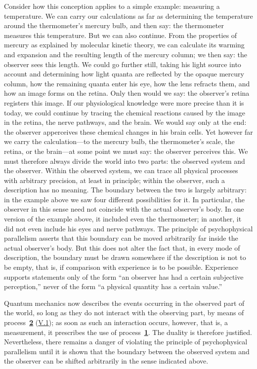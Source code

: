 \documentclass[fontsize=13pt,twoside,openany,headings=normal,parskip=false,bookmarkpackage=false,DIV=calc]{scrbook}
\begin{document}
Consider how this conception applies to a simple example: measuring a temperature. We can carry our calculations as far as determining the temperature around the thermometer's mercury bulb, and then say: the thermometer measures this temperature. But we can also continue. From the properties of mercury as explained by molecular kinetic theory, we can calculate its warming and expansion and the resulting length of the mercury column; we then say: the observer sees this length. We could go further still, taking his light source into account and determining how light quanta are reflected by the opaque mercury column, how the remaining quanta enter his eye, how the lens refracts them, and how an image forms on the retina. Only then would we say: the observer's retina registers this image. If our physiological knowledge were more precise than it is today, we could continue by tracing the chemical reactions caused by the image in the retina, the nerve pathways, and the brain. We would say only at the end: the observer apperceives these chemical changes in his brain cells. Yet however far we carry the calculation---to the mercury bulb, the thermometer's scale, the retina, or the brain---at some point we must say: the observer perceives this. We must therefore always divide the world into two parts: the observed system and the observer.
\hypertarget{origpage-224}{}%
Within the observed system, we can trace all physical processes with arbitrary precision, at least in principle; within the observer, such a description has no meaning. The boundary between the two is largely arbitrary: in the example above we saw four different possibilities for it. In particular, the observer in this sense need not coincide with the actual observer's body. In one version of the example above, it included even the thermometer; in another, it did not even include his eyes and nerve pathways. The principle of psychophysical parallelism asserts that this boundary can be moved arbitrarily far inside the actual observer's body. But this does not alter the fact that, in every mode of description, the boundary must be drawn somewhere if the description is not to be empty, that is, if comparison with experience is to be possible. Experience supports statements only of the form ``an observer has had a certain subjective perception,'' never of the form ``a physical quantity has a certain value.''

Quantum mechanics now describes the events occurring in the observed part of the world, so long as they do not interact with the observing part, by means of process~\hyperref[eq:V.1.2]{\textbf{2}} (\hyperref[sec:V.1]{V.1}); as soon as such an interaction occurs, however, that is, a measurement, it prescribes the use of process~\hyperref[eq:V.1.1]{\textbf{1}}. The duality is therefore justified. Nevertheless, there remains a danger of violating the principle of psychophysical parallelism until it is shown that the boundary between the observed system and the observer can be shifted arbitrarily in the sense indicated above.
\end{document}

